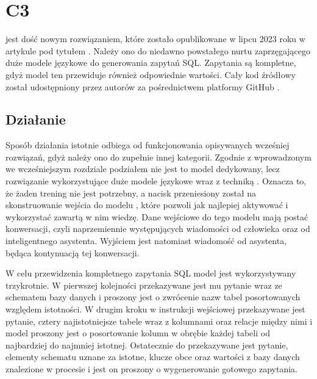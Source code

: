 \section{C3}
 jest dość nowym rozwiązaniem, które zostało opublikowane w lipcu 2023 roku w artykule pod tytułem  . Należy ono do niedawno powstałego nurtu zaprzęgającego duże modele językowe do generowania zapytań SQL. Zapytania są kompletne, gdyż model ten przewiduje również odpowiednie wartości. Cały kod źródłowy  został udostępniony przez autorów za pośrednictwem platformy GitHub . 

\subsection{Działanie}
Sposób działania  istotnie odbiega od funkcjonowania opisywanych wcześniej rozwiązań, gdyż należy ono do zupełnie innej kategorii. Zgodnie z wprowadzonym we wcześniejszym rozdziale podziałem nie jest to model dedykowany, lecz rozwiązanie wykorzystujące duże modele językowe wraz z techniką . Oznacza to, że żaden trening nie jest potrzebny, a nacisk przeniesiony został na skonstruowanie wejścia do modelu , które pozwoli jak najlepiej aktywować i wykorzystać zawartą w nim wiedzę. Dane wejściowe do tego modelu mają postać konwersacji, czyli naprzemiennie występujących wiadomości od człowieka oraz od inteligentnego asystenta. Wyjściem jest natomiast wiadomość od asystenta, będąca kontynuacją tej konwersacji.

W celu przewidzenia kompletnego zapytania SQL model  jest wykorzystywany trzykrotnie. W pierwszej kolejności przekazywane jest mu pytanie wraz ze schematem bazy danych i proszony jest o zwrócenie nazw tabel posortowanych względem istotności. W drugim kroku w instrukcji wejściowej przekazywane jest pytanie, cztery najistotniejsze tabele wraz z kolumnami oraz relacje między nimi i model proszony jest o posortowanie kolumn w obrębie każdej tabeli od najbardziej do najmniej istotnej. Ostatecznie do  przekazywane jest pytanie, elementy schematu uznane za istotne, klucze obce oraz wartości z bazy danych znalezione w procesie  i jest on proszony o wygenerowanie gotowego zapytania.

